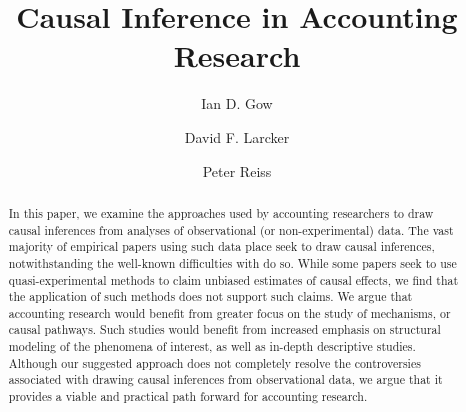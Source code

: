 \documentclass[11pt,reqno]{amsart}
\title[Causal Inference in Accounting]{Causal Inference in Accounting Research}
\author{Ian D. Gow \and David F. Larcker \and Peter Reiss}
\begin{document}
\usetikzlibrary{automata, shapes, calc, positioning}



\maketitle


\begin{abstract}
	In this paper, we examine the approaches used by accounting researchers to draw causal inferences from analyses of observational (or non-experimental) data. 
	The vast majority of empirical papers using such data place seek to draw causal inferences, notwithstanding the well-known difficulties with do so.
	While some papers seek to use quasi-experimental methods to claim unbiased estimates of causal effects, we find that the application of such methods does not support such claims.
	We argue that  accounting research would benefit from greater focus on the study of  mechanisms, or causal pathways.
	Such studies would benefit from increased emphasis on structural modeling of the phenomena of interest, as well as in-depth descriptive studies.  
	Although our suggested approach does not completely resolve the  controversies associated with drawing causal inferences from observational data, we argue that it provides a viable and practical path forward for accounting research.
\end{abstract}
\end{document}
